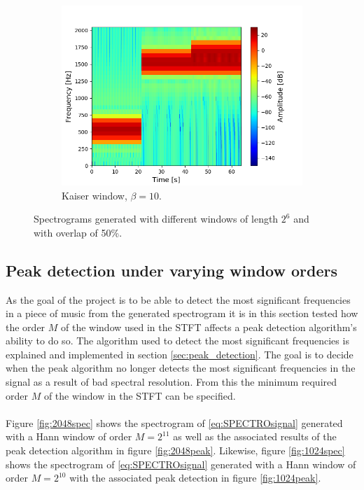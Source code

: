 \begin{figure}[H]
\begin{subfigure}{0.49\textwidth}
\includegraphics[width=\textwidth]{figures/stft_windows/100/kaiser_10.png}
\caption{Kaiser window, $\beta=10$.}
\label{fig:stft_kaiser_100_10}
\end{subfigure}
\caption{Spectrograms generated with different windows of length $2^6$ and with overlap of 50\%.}
\label{fig:stft_windows_100}
\end{figure}
\subsection{Peak detection under varying window orders}
As the goal of the project is to be able to detect the most significant frequencies in a piece of music from the generated spectrogram it is in this section tested how the order $M$ of the window used in the STFT affects a peak detection algorithm's ability to do so. The algorithm used to detect the most significant frequencies is explained and implemented in section \ref{sec:peak_detection}. The goal is to decide when the peak algorithm no longer detects the most significant frequencies in the signal as a result of bad spectral resolution. From this the minimum required order $M$ of the window in the STFT can be specified.\\\\
Figure \ref{fig:2048spec} shows the spectrogram of \eqref{eq:SPECTROsignal} generated with a Hann window of order $M=2^{11}$ as well as the associated results of the peak detection algorithm in figure \ref{fig:2048peak}. Likewise, figure \ref{fig:1024spec} shows the spectrogram of \eqref{eq:SPECTROsignal} generated with a Hann window of order $M=2^{10}$ with the associated peak detection in figure \ref{fig:1024peak}.

